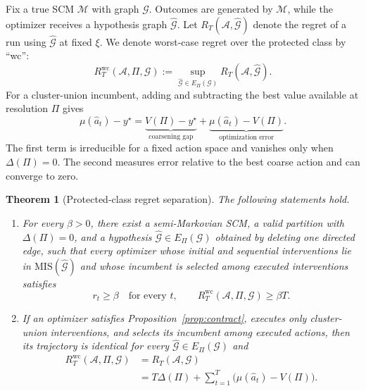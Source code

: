\documentclass[twoside]{article}
\newtheorem{theorem}{Theorem}
\newcommand{\Gg}{\mathcal{G}}
\begin{document}
Fix a true SCM $\mathcal M$ with graph $\Gg$. Outcomes are generated by $\mathcal M$, while the optimizer receives a hypothesis graph $\widehat{\mathcal G}$. Let $R_T(\mathcal A,\widehat{\mathcal G})$ denote the regret of a run using $\widehat{\mathcal G}$ at fixed $\xi$. We denote worst-case regret over the protected class by ``wc'':
\[
 R_T^{\mathrm{wc}}(\mathcal A,\Pi,\Gg)
 :=\sup_{\widehat{\mathcal G}\in E_\Pi(\Gg)}R_T(\mathcal A,\widehat{\mathcal G}).
\]
For a cluster-union incumbent, adding and subtracting the best value available at resolution $\Pi$ gives
\begin{equation}
 \mu(\hat a_t)-y^\star
 =\underbrace{V(\Pi)-y^\star}_{\text{coarsening gap}}
 +\underbrace{\mu(\hat a_t)-V(\Pi)}_{\text{optimization error}}.
 \label{eq:regret-decomposition}
\end{equation}
The first term is irreducible for a fixed action space and vanishes only when $\Delta(\Pi)=0$. The second measures error relative to the best coarse action and can converge to zero.

\begin{theorem}[Protected-class regret separation]
\label{thm:separation}
The following statements hold.
\begin{enumerate}[label=(\roman*),leftmargin=1.6em,itemsep=2pt,topsep=2pt]
  \item For every $\beta>0$, there exist a semi-Markovian SCM, a valid partition with $\Delta(\Pi)=0$, and a hypothesis $\widehat{\mathcal G}\in E_\Pi(\Gg)$ obtained by deleting one directed edge, such that every optimizer whose initial and sequential interventions lie in $\mathrm{MIS}(\widehat{\mathcal G})$ and whose incumbent is selected among executed interventions satisfies
  \[
    r_t\ge\beta\quad\text{for every }t,
    \qquad R_T^{\mathrm{wc}}(\mathcal A,\Pi,\Gg)\ge\beta T.
  \]
  \item If an optimizer satisfies Proposition~\ref{prop:contract}, executes only cluster-union interventions, and selects its incumbent among executed actions, then its trajectory is identical for every $\widehat{\mathcal G}\in E_\Pi(\Gg)$ and
  \[
  \begin{aligned}
  R_T^{\mathrm{wc}}(\mathcal A,\Pi,\Gg)
  &=R_T(\mathcal A,\Gg)\\
  &=T\Delta(\Pi)
   +\sum_{t=1}^{T}\bigl(\mu(\hat a_t)-V(\Pi)\bigr).
  \end{aligned}
  \]
\end{enumerate}
\end{theorem}
\end{document}
